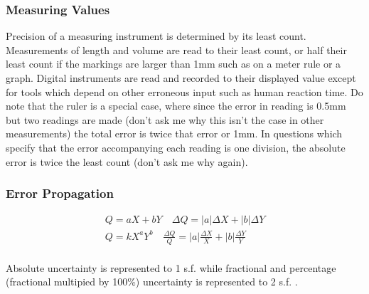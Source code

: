 \documentclass[../main]{subfiles}
\begin{document}



	\subsubsection{Measuring Values}

	Precision of a measuring instrument is determined by its least count. Measurements of length and volume are read to their least count, or half their least count if the markings are larger than 1mm such as on a meter rule or a graph. Digital instruments are read and recorded to their displayed value except for tools which depend on other erroneous input such as human reaction time. Do note that the ruler is a special case, where since the error in reading is 0.5mm but two readings are made (don't ask me why this isn't the case in other measurements) the total error is twice that error or 1mm. In questions which specify that the error accompanying each reading is one division, the absolute error is twice the least count (don't ask me why again).

	\subsubsection{Error Propagation}

	\begin{equation*} \begin{gathered}
		Q = aX + bY \quad \Delta Q = |a| \Delta X + |b| \Delta Y \\
		Q = k  X^a Y^b \quad \frac{\Delta Q}{Q} = |a|\frac{\Delta X}{X} + |b| \frac{\Delta Y}{Y} \\
	\end{gathered} \end{equation*}

	Absolute uncertainty is represented to 1 s.f. while fractional and percentage (fractional multipied by 100\%) uncertainty is represented to 2 s.f. . \\
\end{document}
